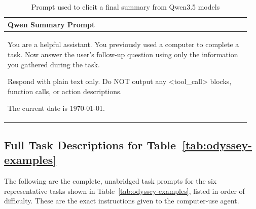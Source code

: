 \documentclass{article}
\theoremstyle{plain}
\theoremstyle{definition}
\theoremstyle{remark}
\begin{document}
\begin{table}[t]
\centering
\begin{tabular}{p{0.95\linewidth}}
\hline
\textbf{Qwen Summary Prompt} \\
\hline
\begin{minipage}{\linewidth}
\vspace{0.5em}
\ttfamily
You are a helpful assistant. You previously used a computer to complete a task. Now answer the user's follow-up question using only the information you gathered during the task.

\vspace{0.5em}

Respond with plain text only. Do NOT output any <tool\_call> blocks, function calls, or action descriptions.

\vspace{0.5em}

The current date is \today.
\vspace{0.5em}
\end{minipage} \\
\hline
\end{tabular}
\caption{Prompt used to elicit a final summary from Qwen3.5 models}
\label{tab:qwen-summary-prompt}
\end{table}



\subsection{Full Task Descriptions for Table~\ref{tab:odyssey-examples}} \label{app:examples}

The following are the complete, unabridged task prompts for the six representative tasks shown in Table~\ref{tab:odyssey-examples}, listed in order of difficulty. These are the exact instructions given to the computer-use agent.
\end{document}
